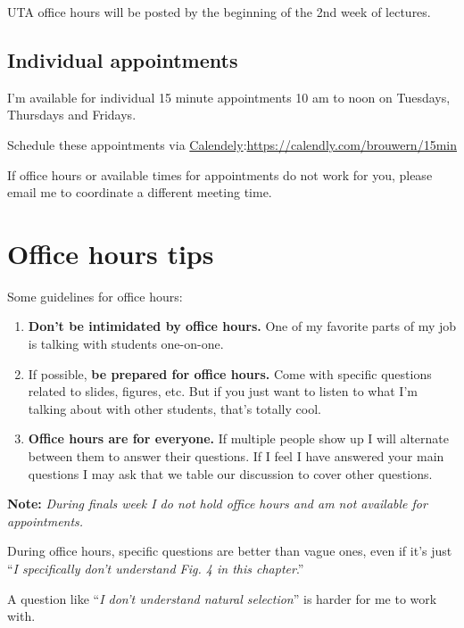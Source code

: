 \documentclass[
]{book}
\providecommand{\tightlist}{%
  \setlength{\itemsep}{0pt}\setlength{\parskip}{0pt}}
\begin{document}
UTA office hours will be posted by the beginning of the 2nd week of lectures.

\hypertarget{individual-appointments}{%
\section{Individual appointments}\label{individual-appointments}}

I'm available for individual 15 minute appointments 10 am to noon on Tuesdays, Thursdays and Fridays.

Schedule these appointments via \href{https://calendly.com/brouwern/15min}{Calendely}:\url{https://calendly.com/brouwern/15min}

If office hours or available times for appointments do not work for you, please email me to coordinate a different meeting time.

\hypertarget{office-hours-tips}{%
\chapter{Office hours tips}\label{office-hours-tips}}

Some guidelines for office hours:

\begin{enumerate}
\def\labelenumi{\arabic{enumi}.}
\tightlist
\item
  \textbf{Don't be intimidated by office hours.} One of my favorite parts of my job is talking with students one-on-one.
\item
  If possible, \textbf{be prepared for office hours.} Come with specific questions related to slides, figures, etc. But if you just want to listen to what I'm talking about with other students, that's totally cool.
\item
  \textbf{Office hours are for everyone.} If multiple people show up I will alternate between them to answer their questions. If I feel I have answered your main questions I may ask that we table our discussion to cover other questions.
\end{enumerate}

\textbf{Note:} \emph{During finals week I do not hold office hours and am not available for appointments.}

During office hours, specific questions are better than vague ones, even if it's just ``\emph{I specifically don't understand Fig. 4 in this chapter}.''

A question like ``\emph{I don't understand natural selection}'' is harder for me to work with.
\end{document}
